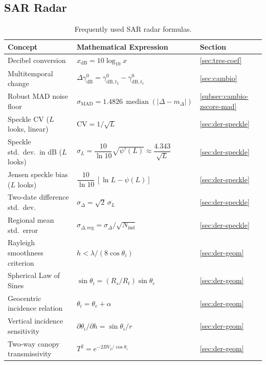 \documentclass[11pt,a4paper]{article}
\begin{document}
\subsection*{SAR Radar}
\begin{table}[htbp]
\centering
\caption{Frequently used SAR radar formulas.}
\label{tab:formulas-radar}
\small
\begin{tabularx}{\linewidth}{@{}lXl@{}}
\toprule
Concept & Mathematical Expression & Section \\
\midrule
Decibel conversion & $x_{\mathrm{dB}}=10\log_{10}x$ & \ref{sec:tres-coef} \\
Multitemporal change & $\Delta\gamma^0_{\mathrm{dB}}=\gamma^0_{\mathrm{dB},t_2}-\gamma^0_{\mathrm{dB},t_1}$ & \ref{sec:cambio} \\
Robust MAD noise floor & $\sigma_{\mathrm{MAD}}=1.4826\,\operatorname{median}(|\Delta-m_\Delta|)$ & \ref{subsec:cambio-zscore-mad} \\
Speckle CV ($L$ looks, linear) & $\mathrm{CV}=1/\sqrt L$ & \ref{sec:der-speckle} \\
Speckle std.\ dev.\ in dB ($L$ looks) & $\sigma_L = \dfrac{10}{\ln10}\sqrt{\psi'(L)} \approx \dfrac{4.343}{\sqrt{L}}$ & \ref{sec:der-speckle} \\
Jensen speckle bias ($L$ looks) & $\dfrac{10}{\ln10}\,[\ln L-\psi(L)]$ & \ref{sec:der-speckle} \\
Two-date difference std.\ dev. & $\sigma_\Delta=\sqrt2\,\sigma_L$ & \ref{sec:der-speckle} \\
Regional mean std.\ error & $\sigma_{\Delta,\mathrm{reg}}=\sigma_\Delta/\sqrt{N_{\mathrm{ind}}}$ & \ref{sec:der-speckle} \\
Rayleigh smoothness criterion & $h<\lambda/(8\cos\theta_i)$ & \ref{sec:der-geom} \\
Spherical Law of Sines & $\sin\theta_i=(R_s/R_t)\sin\theta_e$ & \ref{sec:der-geom} \\
Geocentric incidence relation & $\theta_i=\theta_e+\alpha$ & \ref{sec:der-geom} \\
Vertical incidence sensitivity & $\partial\theta_i/\partial h=\sin\theta_i/r$ & \ref{sec:der-geom} \\
Two-way canopy transmissivity & $T^2=e^{-2BV_2/\cos\theta_i}$ & \ref{sec:der-geom} \\
\bottomrule
\end{tabularx}
\end{table}
\end{document}
